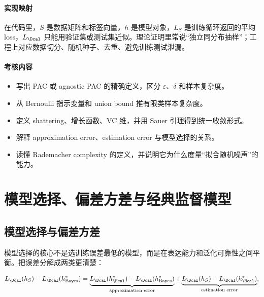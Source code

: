 \paragraph{实现映射}

在代码里，\(S\) 是数据矩阵和标签向量，\(h\) 是模型对象，\(L_S\) 是训练循环返回的平均 loss，\(L_{\Dcal}\) 只能用验证集或测试集近似。理论证明里常说“独立同分布抽样”；工程上对应数据切分、随机种子、去重、避免训练测试泄漏。

\paragraph{考核内容}

\begin{itemize}
  \item 写出 PAC 或 agnostic PAC 的精确定义，区分 \(\varepsilon\)、\(\delta\) 和样本复杂度。
  \item 从 Bernoulli 指示变量和 union bound 推有限类样本复杂度。
  \item 定义 shattering、增长函数、VC 维，并用 Sauer 引理得到统一收敛形式。
  \item 解释 approximation error、estimation error 与模型选择的关系。
  \item 读懂 Rademacher complexity 的定义，并说明它为什么度量“拟合随机噪声”的能力。
\end{itemize}

\section{模型选择、偏差方差与经典监督模型}


\subsection{模型选择与偏差方差}


模型选择的核心不是选训练误差最低的模型，而是在表达能力和泛化可靠性之间平衡。把误差分解成两类更清楚：

\[
  L_{\Dcal}(h_S)-L_{\Dcal}(h^*_{\mathrm{Bayes}})
  =
  \underbrace{
    L_{\Dcal}(h^*_{\Hcal})-L_{\Dcal}(h^*_{\mathrm{Bayes}})
  }_{\text{approximation error}}
  +
  \underbrace{
    L_{\Dcal}(h_S)-L_{\Dcal}(h^*_{\Hcal})
  }_{\text{estimation error}},
\]

